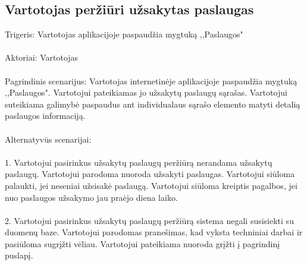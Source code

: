 \documentclass[oneside]{VUMIFPSkursinis}
\begin{document}
\subsection{Vartotojas peržiūri užsakytas paslaugas}
	Trigeris: Vartotojas aplikacijoje paspaudžia mygtuką ,,Paslaugos"\\ \\
	Aktoriai: Vartotojas\\ \\
	Pagrindinis scenarijus: Vartotojas internetinėje aplikacijoje paspaudžia mygtuką ,,Paslaugos". Vartotojui pateikiamas jo užsakytų paslaugų sąrašas. Vartotojui suteikiama galimybė paspaudus ant individualaus sąrašo elemento matyti detalią paslaugos informaciją.\\ \\
	Alternatyvūs scenarijai:\\ \\
1. Vartotojui pasirinkus užsakytų paslaugų peržiūrą nerandama užsakytų paslaugų. Vartotojui parodoma nuoroda užsakyti paslaugas. Vartotojui siūloma palaukti, jei neseniai užsisakė paslaugą. Vartotojui siūloma kreiptis pagalbos, jei nuo paslaugos užsakymo jau praėjo diena laiko.\\ \\
2. Vartotojui pasirinkus užsakytų paslaugų peržiūrą sistema negali susisiekti su duomenų baze. Vartotojui parodomas pranešimas, kad vyksta techniniai darbai ir pasiūloma sugrįžti vėliau. Vartotojui pateikiama nuoroda grįžti į pagrindinį puslapį.\\ \\
\end{document}

